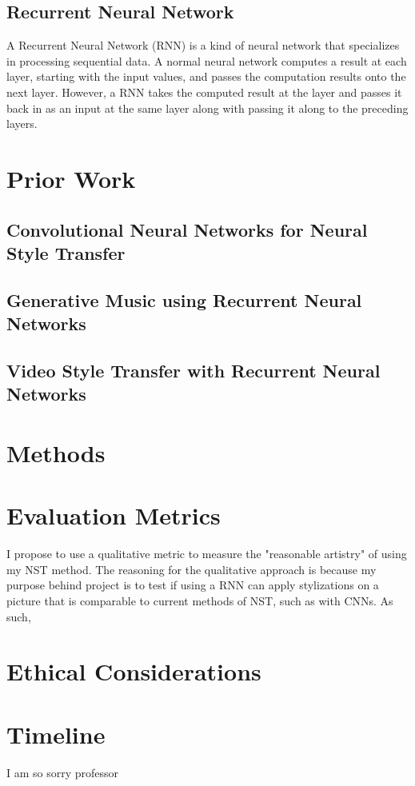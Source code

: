 \documentclass[10pt,twocolumn]{article}
\begin{document}
\subsection{Recurrent Neural Network}
A Recurrent Neural Network (RNN) is a kind of neural network that specializes in processing sequential data. A normal neural network computes a result at each layer, starting with the input values, and passes the computation results onto the next layer. However, a RNN takes the computed result at the layer and passes it back in as an input at the same layer along with passing it along to the preceding layers.

\section{Prior Work}

\subsection{Convolutional Neural Networks for Neural Style Transfer}

\subsection{Generative Music using Recurrent Neural Networks}

\subsection{Video Style Transfer with Recurrent Neural Networks}

\section{Methods}

\section{Evaluation Metrics}
I propose to use a qualitative metric to measure the "reasonable artistry" of using my NST method. The reasoning for the qualitative approach is because my purpose behind project is to test if using a RNN can apply stylizations on a picture that is comparable to current methods of NST, such as with CNNs. As such, 

\section{Ethical Considerations}

\section{Timeline}
I am so sorry professor
\printbibliography 
\end{document}
